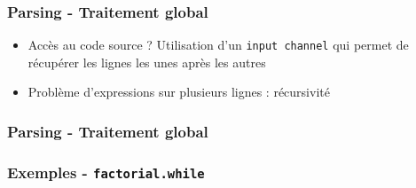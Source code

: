 \documentclass{beamer}
\begin{document}
\begin{frame}
\frametitle{Parsing - Traitement global}
\begin{itemize}
\item Accès au code source ? Utilisation d'un \texttt{input channel} qui permet de récupérer les lignes les unes après les autres
\item Problème d'expressions sur plusieurs lignes : récursivité
\end{itemize}
\end{frame}
\begin{frame}[fragile]
\frametitle{Parsing - Traitement global}
\begin{scriptsize}

\end{scriptsize}
\end{frame}

\begin{frame}[fragile]
\frametitle{Exemples - \texttt{factorial.while}}
\begin{scriptsize}

\end{scriptsize}
\end{frame}
\end{document}
